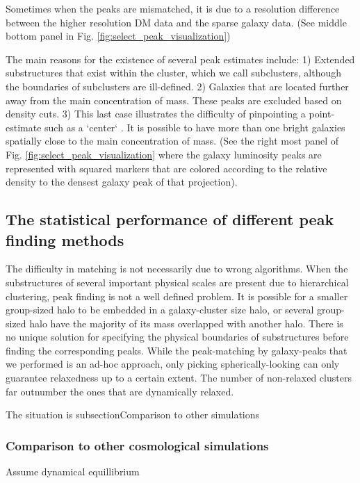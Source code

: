 Sometimes when the peaks are mismatched, it is due to a resolution difference 
between the higher resolution DM data and the sparse galaxy data. 
(See middle bottom panel in Fig. \ref{fig:select_peak_visualization})



The main reasons for the existence of several peak estimates include:
1) Extended substructures that exist within the cluster, which we call
subclusters, although the boundaries of subclusters are ill-defined.
2) Galaxies that are located further away from the main concentration of mass.
These peaks are excluded based on density cuts.
3) This last case illustrates the difficulty of pinpointing a point-estimate
such as a `center` . It is 
possible to have more than one bright galaxies spatially close to the main
concentration of mass. 
(See the right most panel of Fig. \ref{fig:select_peak_visualization}
where the galaxy luminosity peaks are represented with squared markers that are
colored according to the relative density to the densest galaxy peak of that 
projection). 

\subsection{The statistical performance of different peak finding methods}
The difficulty in matching is not necessarily due to wrong algorithms.
When the substructures of several important physical scales are present due to
hierarchical clustering, peak finding is not a well defined problem.
It is possible for a smaller group-sized halo to be embedded in a
galaxy-cluster size halo, or several group-sized halo have the majority of its
mass overlapped with another halo.
There is no unique solution for specifying the physical boundaries of substructures
before finding the corresponding peaks. 
While the peak-matching by galaxy-peaks that
we performed is an ad-hoc approach, only picking spherically-looking can only
guarantee relaxedness up to a certain extent. 
The number of non-relaxed clusters far outnumber the ones that are dynamically 
relaxed. 

The situation is subsection{Comparison to other simulations}
\subsubsection{Comparison to other cosmological simulations}



Assume dynamical equillibrium 


